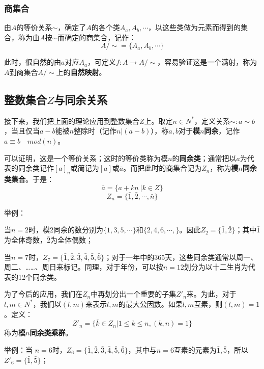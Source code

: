 \documentclass[12pt]{article}
\begin{document}
\subsubsection{商集合}
由$A$的等价关系$\sim$，确定了$A$的各个类$A_a, A_b, \cdots$，以这些类做为元素而得到的集合，称为由$A$按$\sim$而确定的商集合，记作：
$$
A / \sim = \{A_a, A_b, \cdots \}
$$

此时，很自然的由$a$对应$A_a$，可定义$f: A \rightarrow A/\sim$，容易验证这是一个满射，称为$A$到商集合$A/\sim$上的\textbf{自然映射}。

\subsection{整数集合$Z$与同余关系}
接下来，我们把上面的理论应用到整数集合$Z$上。取定$n\in N^*$，定义关系$\sim: a \sim b$，当且仅当$a-b$能被$n$整除时（记作$n|(a-b)$），称$a,b$对于\textbf{模$n$同余}，记作$ a \equiv b\quad mod(n)$。

可以证明，这是一个等价关系；这时的等价类称为模$n$的\textbf{同余类}；通常把以$a$为代表的同余类记作$[a]_n$或简记为$[a]$或$\bar{a}$。而把此时的商集合记为$Z_n$，称为\textbf{模$n$同余类集合}。于是：
$$
\bar{a} = \{a + kn\ | k \in Z\}
$$
$$
Z_n = \{\bar{1}, \bar{2}, \cdots, \bar{n}\}
$$

\begin{framed}
\small {
举例：

当$n=2$时，模2同余的数分别为$\{1, 3, 5, \cdots\}$和$\{2, 4, 6, \cdots, \}$。因此$Z_2 = \{\bar{1}, \bar{2}\}$；其中$\bar{1}$为全体奇数，$\bar{2}$为全体偶数；

当$n=7$时，$Z_7 = \{\bar{1}, \bar{2}, \bar{3}, \bar{4}, \bar{5}, \bar{6} \}$；对于一年中的365天，这些同余类通常以周一、周二、……、周日来标记。同理，对于年份，可以按$n=12$划分为以十二生肖为代表的12个同余类。
}
\end{framed}

为了今后的应用，我们在$Z_n$中再划分出一个重要的子集$Z'_n$来。为此，对于$l, m \in N^*$，我们以$(l, m)$来表示$l, m$的最大公因数。如果$l, m$互素，则$(l,m)=1$。定义：
$$
Z'_n = \{\bar{k} \in Z_n | 1 \le k \le n, (k,n) = 1\}
$$
称为\textbf{模$n$同余类乘群}。

\begin{framed}
\small {
举例：当 $n=6$时，$Z_6 = \{\bar{1}, \bar{2}, \bar{3}, \bar{4}, \bar{5}, \bar{6}\}$，其中与$n=6$互素的元素为$\bar{1}, \bar{5}$，所以$Z'_6 = \{\bar{1}, \bar{5}\}$；
}
\end{framed}
\end{document}
